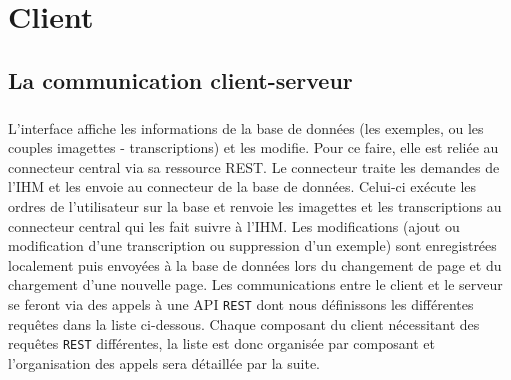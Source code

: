 \chapter{Client}

\section{La communication client-serveur}

\paragraph{}
L’interface affiche les informations de la base de données (les exemples, ou les couples imagettes - transcriptions) et les modifie. Pour ce faire, elle est reliée au connecteur central via sa ressource REST. Le connecteur traite les demandes de l’IHM et les envoie au connecteur de la base de données. Celui-ci exécute les ordres de l’utilisateur sur la base et renvoie les imagettes et les transcriptions au connecteur central qui les fait suivre à l’IHM. Les modifications (ajout ou modification d’une transcription ou suppression d’un exemple) sont enregistrées localement puis envoyées à la base de données lors du changement de page et du chargement d'une nouvelle page.
\newline{}
Les communications entre le client et le serveur se feront via des appels à une API \texttt{REST} dont nous définissons les différentes requêtes dans la liste ci-dessous. Chaque composant du client nécessitant des requêtes \texttt{REST} différentes, la liste est donc organisée par composant et l'organisation des appels sera détaillée par la suite.
\newline{}

